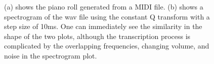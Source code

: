 \documentclass[5p]{elsarticle}
\begin{document}
\begin{figure}[t]
\begin{center}
\end{center}
\caption{(a) shows the piano roll generated from a MIDI file. (b) shows a spectrogram of the wav file using the constant Q transform with a step size of 10ms. One can immediately see the similarity in the shape of the two plots, although the transcription process is complicated by the overlapping frequencies, changing volume, and noise in the spectrogram plot.}
\end{figure}
\end{document}
